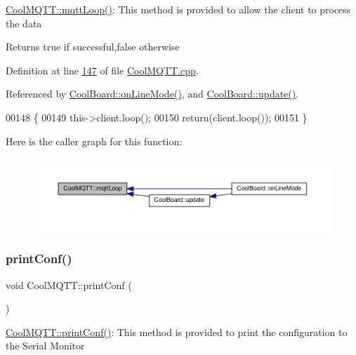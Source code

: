 \hyperlink{class_cool_m_q_t_t_aa5eaae967b562b62cbcf2b8d81f6e5d5}{Cool\+M\+Q\+T\+T\+::mqtt\+Loop()}\+: This method is provided to allow the client to process the data

\begin{DoxyReturn}{Returns}
true if successful,false otherwise 
\end{DoxyReturn}


Definition at line \hyperlink{_cool_m_q_t_t_8cpp_source_l00147}{147} of file \hyperlink{_cool_m_q_t_t_8cpp_source}{Cool\+M\+Q\+T\+T.\+cpp}.



Referenced by \hyperlink{_cool_board_8cpp_source_l00097}{Cool\+Board\+::on\+Line\+Mode()}, and \hyperlink{_cool_board_8cpp_source_l00411}{Cool\+Board\+::update()}.


\begin{DoxyCode}
00148 \{
00149     this->client.loop();
00150     \textcolor{keywordflow}{return}(client.loop());
00151 \}
\end{DoxyCode}
Here is the caller graph for this function\+:
\nopagebreak
\begin{figure}[H]
\begin{center}
\leavevmode
\includegraphics[width=350pt]{class_cool_m_q_t_t_aa5eaae967b562b62cbcf2b8d81f6e5d5_icgraph}
\end{center}
\end{figure}
\mbox{\label{class_cool_m_q_t_t_a40553a0ad4b5ecf1cb4411ab54ca85fb}} 
\subsubsection{\texorpdfstring{print\+Conf()}{printConf()}}
{\footnotesize\ttfamily void Cool\+M\+Q\+T\+T\+::print\+Conf (\begin{DoxyParamCaption}{ }\end{DoxyParamCaption})}

\hyperlink{class_cool_m_q_t_t_a40553a0ad4b5ecf1cb4411ab54ca85fb}{Cool\+M\+Q\+T\+T\+::print\+Conf()}\+: This method is provided to print the configuration to the Serial Monitor 

